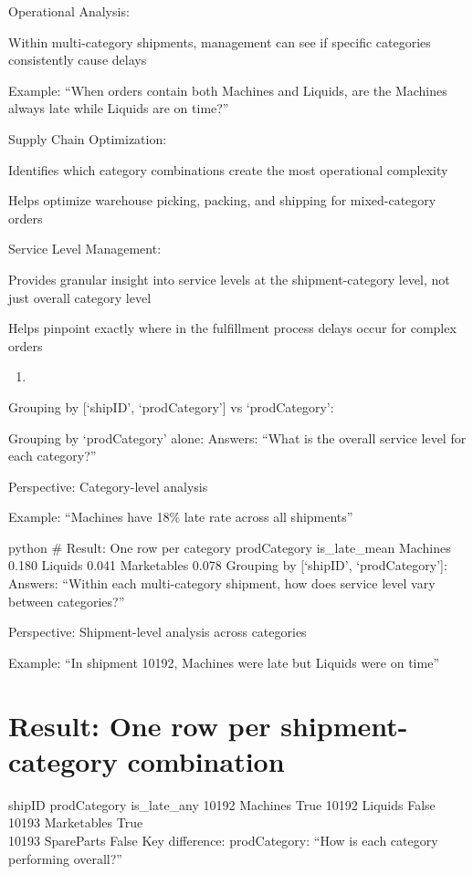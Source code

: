 \documentclass[
  letterpaper,
  DIV=11,
  numbers=noendperiod]{scrartcl}
\providecommand{\tightlist}{%
  \setlength{\itemsep}{0pt}\setlength{\parskip}{0pt}}
\begin{document}
Operational Analysis:

Within multi-category shipments, management can see if specific
categories consistently cause delays

Example: ``When orders contain both Machines and Liquids, are the
Machines always late while Liquids are on time?''

Supply Chain Optimization:

Identifies which category combinations create the most operational
complexity

Helps optimize warehouse picking, packing, and shipping for
mixed-category orders

Service Level Management:

Provides granular insight into service levels at the shipment-category
level, not just overall category level

Helps pinpoint exactly where in the fulfillment process delays occur for
complex orders

\begin{enumerate}
\def\labelenumi{\arabic{enumi}.}
\setcounter{enumi}{1}
\tightlist
\item
\end{enumerate}

Grouping by {[}`shipID', `prodCategory'{]} vs `prodCategory':

Grouping by `prodCategory' alone: Answers: ``What is the overall service
level for each category?''

Perspective: Category-level analysis

Example: ``Machines have 18\% late rate across all shipments''

python \# Result: One row per category prodCategory is\_late\_mean
Machines 0.180 Liquids 0.041 Marketables 0.078 Grouping by {[}`shipID',
`prodCategory'{]}: Answers: ``Within each multi-category shipment, how
does service level vary between categories?''

Perspective: Shipment-level analysis across categories

Example: ``In shipment 10192, Machines were late but Liquids were on
time''

\section{Result: One row per shipment-category
combination}\label{result-one-row-per-shipment-category-combination}

shipID prodCategory is\_late\_any 10192 Machines True 10192 Liquids
False 10193 Marketables True\\
10193 SpareParts False Key difference: prodCategory: ``How is each
category performing overall?''
\end{document}

